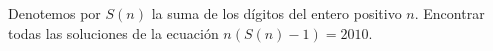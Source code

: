 Denotemos por $S(n)$ la suma de los dígitos del entero positivo $n$. Encontrar todas las soluciones de la ecuación $n(S(n)-1)=2010.$
